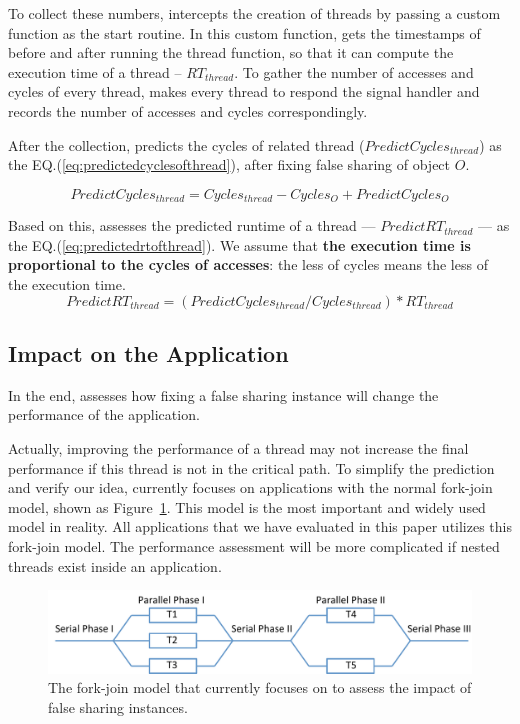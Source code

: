 To collect these numbers, \cheetah{} intercepts the creation of threads by passing a custom function as the start routine. In this custom function, \cheetah{} gets the timestamps of before and after running the thread function, so that it can compute the execution time of a thread -- $RT_{thread}$. To gather the number of accesses and cycles of every thread, \cheetah{} makes every thread to respond the signal handler and records the number of accesses and cycles correspondingly. 

After the collection, \cheetah{} predicts the cycles of related thread ($PredictCycles_{thread}$) as the EQ.(\ref{eq:predictedcyclesofthread}), after fixing false sharing of object $O$. 

\begin{equation}
\label{eq:predictedcyclesofthread}
 PredictCycles_{thread} = Cycles_{thread} - Cycles_{O} + PredictCycles_{O} 
\end{equation} 
 
Based on this, \cheetah{} assesses the predicted runtime of a thread --- $PredictRT_{thread}$ --- as the EQ.(\ref{eq:predictedrtofthread}). We assume that {\bf the execution time is proportional to the cycles of accesses}: the less of cycles means the less of the execution time. 
\begin{equation}
\label{eq:predictedrtofthread}
 PredictRT_{thread} = (PredictCycles_{thread}/Cycles_{thread}) * RT_{thread} 
\end{equation} 

\subsection{Impact on the Application}
\label{sec:impactapp}

In the end, \cheetah{} assesses how fixing a false sharing instance will change the performance of the application. 

Actually, improving the performance of a thread may not increase the final performance if this thread is not in the critical path.  
To simplify the prediction and verify our idea, \cheetah{} currently focuses on applications with the normal fork-join model, shown as Figure~\ref{fig:forkjoinmodel}. This model is the most important and widely used model in reality. All applications that we have evaluated in this paper utilizes this fork-join model. The performance assessment will be more complicated if nested threads exist inside an application. 


\begin{figure}[ht!]
\begin{center}
\includegraphics[width=6in]{figure/forkjoin}
\end{center}
\caption{The fork-join model that \Cheetah{} currently focuses on to assess the impact of false sharing instances. }
\label{fig:forkjoinmodel}
\end{figure}

